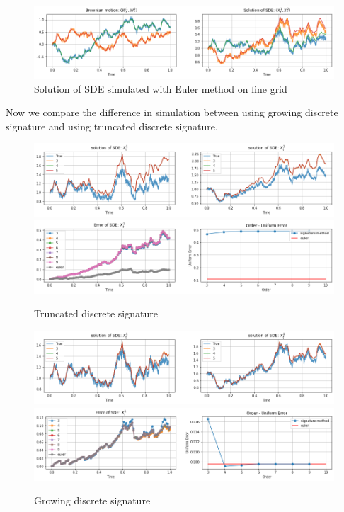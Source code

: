 \documentclass[12pt]{report}
\theoremstyle{definition}
\theoremstyle{remark}
\begin{document}
\begin{figure}[H]
    \centering
    \includegraphics[width=\textwidth]{figs/sde1.png}
    \caption{Solution of SDE simulated with Euler method on fine grid}
\end{figure}
Now we compare the difference in simulation between using growing discrete signature and using truncated discrete signature.
\begin{figure}[H]
    \centering
    \includegraphics[width=\textwidth]{figs/sde2.png}
    \includegraphics[width=\textwidth]{figs/sde3.png}
    \caption{Truncated discrete signature}
\end{figure}
\begin{figure}[H]
    \centering
    \includegraphics[width=\textwidth]{figs/sde4.png}
    \includegraphics[width=\textwidth]{figs/sde5.png}
    \caption{Growing discrete signature}
\end{figure}
\end{document}
